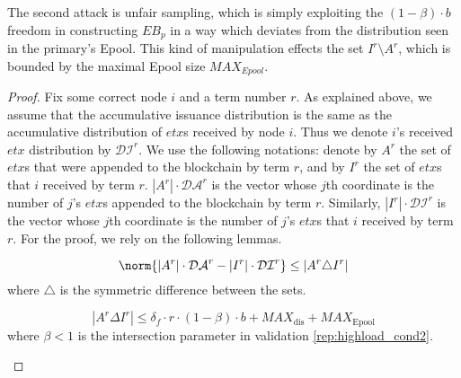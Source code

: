 The second attack is unfair sampling, which is simply exploiting the $(1-\beta) \cdot b$ freedom in constructing $EB_p$ in a way which deviates from the distribution seen in the primary's Epool. This kind of manipulation effects the set $I^r\setminus A^r$, which is bounded by the maximal Epool size $MAX_{Epool}$.


\begin{proof}
Fix some correct node $i$ and a term number $r$. As explained above, we assume that the accumulative issuance distribution is the same as the accumulative distribution of $etx$s received by node $i$. Thus we denote $i$'s received $etx$ distribution by $\mathcal{DI}^r$. We use the following notations: denote by $A^r$ the set of $etx$s that were appended to the blockchain by term $r$, and by $I^{r}$ the set of $etx$s that $i$ received by term $r$. $|A^r|\cdot \mathcal{DA}^r$ is the vector whose $j$th coordinate is the number of $j$'s $etx$s appended to the blockchain by term $r$. Similarly, $|I^r|\cdot \mathcal{DI}^{r}$ is the vector whose $j$th coordinate is the number of $j$'s $etx$s that $i$ received by term $r$. 
For the proof, we rely on the following lemmas.

\begin{lemma} \label{lemma:rep_symetric}
\begin{equation} \label{eq:rep_symetric}
\norm{|A^r|\cdot \mathcal{DA}^r-|I^{r}|\cdot\mathcal{DI}^{r}}\leq \left | A^r \triangle I^{r} \right | 
\end{equation}
where $\triangle$ is the symmetric difference between the sets. 
\end{lemma}
\begin{lemma} \label{lemma:rep_AminusI} 
 \begin{equation}|A^r\Delta I^r |\leq \delta_f\cdot r \cdot (1-\beta)\cdot b+MAX_\text{dis}+MAX_\text{Epool}
 \end{equation}
 where $\beta<1$ is the intersection parameter in validation \ref{rep:highload_cond2}.
\end{lemma}


\end{proof}
